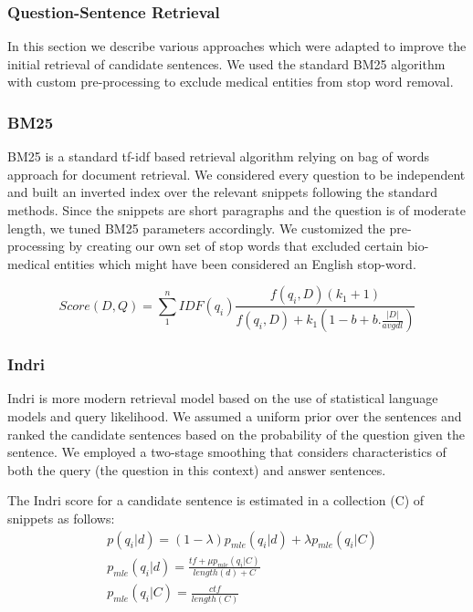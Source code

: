 \subsubsection{Question-Sentence Retrieval}
In this section we describe various approaches which were adapted to improve the initial retrieval of candidate sentences. We used the standard BM25 algorithm with custom pre-processing to exclude medical entities from stop word removal.  

\subsubsection*{BM25}
BM25 \cite{BM25} is a standard tf-idf based retrieval algorithm relying on bag of words approach for document retrieval. We considered every question to be independent and built an inverted index over the relevant snippets following the standard methods. Since the snippets are short paragraphs and the question is of moderate length, we tuned BM25 parameters accordingly. We customized the pre-processing by creating our own set of stop words that excluded certain bio-medical entities which might have been considered an English stop-word.

\[Score(D, Q) = \sum_1^n IDF(q_i) \frac{f(q_i, D) (k_1 + 1)}{f(q_i, D) + k_1 (1- b + b . \frac{|D|}{avgdl})} \]



\subsubsection*{Indri}

Indri \cite{Indri} is more modern retrieval model based on the use of statistical language models and query likelihood. We assumed a uniform prior over the sentences and ranked the candidate sentences based on the probability of the question given the sentence. 
We employed a two-stage smoothing that considers characteristics of both the query (the question in this context) and answer sentences. 

The Indri score for a candidate sentence is estimated in a collection (C) of snippets as follows:
\begin{align}
    & p(q_i|d) = (1-\lambda) p_{mle} (q_i|d) + \lambda p_{mle} (q_i|C) \label{eq1} \\ 
    & p_{mle}(q_i|d) = 
    \frac{tf + \mu  p_{mle}(q_i|C)}{length(d) + C} \label{eq2} \\ 
    & p_{mle}(q_i | C) = \frac{ctf}{length(C)}
\end{align}

